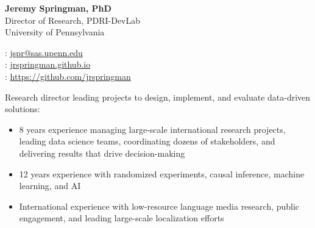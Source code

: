 \documentclass[11pt]{article}
\renewcommand{\today}{\monthname[\the\month] \the\year}
\begin{document}
\thispagestyle{empty}



\begin{multicols}{2}
{\Large {\bf Jeremy Springman, PhD}}\\
Director of Research, PDRI-DevLab\\
University of Pennsylvania\\

\columnbreak
\begin{flushright}

\faEnvelope: \href{mailto:jspr@sas.upenn.edu}{jspr@sas.upenn.edu}\\
\faLaptop: \url{jrspringman.github.io}\\
\faGithub: \url{https://github.com/jrspringman}\\
\end{flushright}
\end{multicols}
\vspace{-10pt}

Research director leading projects to design, implement, and evaluate data-driven solutions:
\begin{itemize}[itemsep=0mm, parsep=0pt]
\item 8 years experience managing large-scale international research projects, leading data science teams, coordinating dozens of stakeholders, and delivering results that drive decision-making
\item 12 years experience with randomized experiments, causal inference, machine learning, and AI 
\item International experience with low-resource language media research, public engagement, and leading large-scale localization efforts
\end{itemize}
\end{document}
